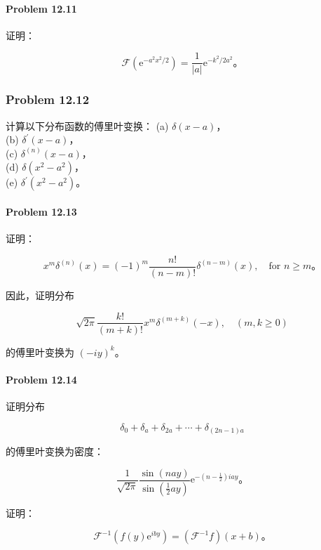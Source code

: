 \paragraph{Problem 12.11}\label{problem-12.11}

证明：

$$
\mathcal{F}\left(\mathrm{e}^{-a^{2} x^{2} / 2}\right) = \frac{1}{|a|} \mathrm{e}^{-k^{2} / 2 a^{2}}。
$$

\subsubsection{Problem 12.12}\label{problem-12.12}

计算以下分布函数的傅里叶变换： (a) $\delta(x-a)$，\\
(b) $\delta^{\prime}(x-a)$，\\
(c) $\delta^{(n)}(x-a)$，\\
(d) $\delta\left(x^{2}-a^{2}\right)$，\\
(e) $\delta^{\prime}\left(x^{2}-a^{2}\right)$。

\paragraph{Problem 12.13}\label{problem-12.13}

证明：

$$
x^{m} \delta^{(n)}(x) = (-1)^{m} \frac{n!}{(n-m)!} \delta^{(n-m)}(x), \quad \text{for } n \geq m。
$$

因此，证明分布

$$
\sqrt{2 \pi} \frac{k!}{(m+k)!} x^{m} \delta^{(m+k)}(-x), \quad (m, k \geq 0)
$$

的傅里叶变换为 $(-i y)^{k}$。

\paragraph{Problem 12.14}\label{problem-12.14}

证明分布

$$
\delta_{0} + \delta_{a} + \delta_{2 a} + \cdots + \delta_{(2 n-1) a}
$$

的傅里叶变换为密度：

$$
\frac{1}{\sqrt{2 \pi}} \frac{\sin (n a y)}{\sin \left(\frac{1}{2} a y\right)} \mathrm{e}^{-\left(n-\frac{1}{2}\right) i a y}。
$$

证明：

$$
\mathcal{F}^{-1}\left(f(y) \mathrm{e}^{i b y}\right) = \left(\mathcal{F}^{-1} f\right)(x+b)。
$$

